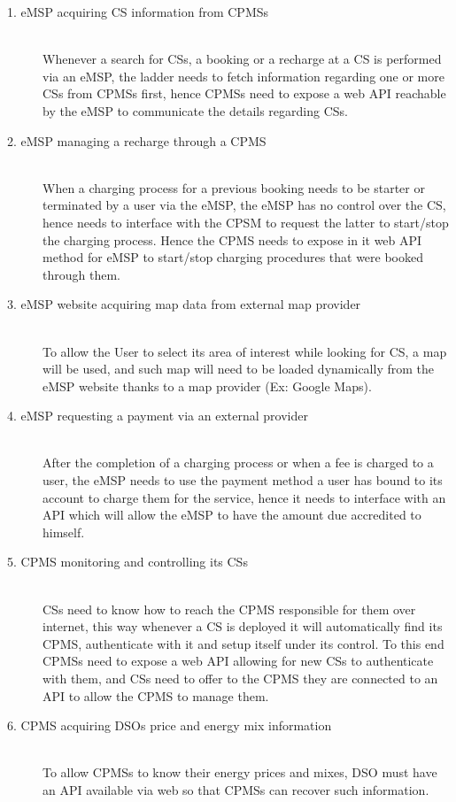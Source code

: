 \documentclass[11pt]{article}
\begin{document}
\begin{description}
    \item [1. eMSP acquiring CS information from CPMSs] \hfill \\
        Whenever a search for CSs, a booking or a recharge at a CS is performed via an eMSP, the ladder needs to fetch information regarding one or more CSs from CPMSs first, hence CPMSs need to expose a web API reachable by the eMSP to communicate the details regarding CSs.
    \item [2. eMSP  managing a recharge through a CPMS] \hfill \\
        When a charging process for a previous booking needs to be starter or terminated by a user via the eMSP, the eMSP has no control over the CS, hence needs to interface with the CPSM to request the latter to start/stop the charging process. Hence the CPMS needs to expose in it web API method for eMSP to start/stop charging procedures that were booked through them.
    \item [3. eMSP website acquiring map data from external map provider] \hfill \\
        To allow the User to select its area of interest while looking for CS, a map will be used, and such map will need to be loaded dynamically from the eMSP website thanks to a map provider (Ex: Google Maps).
    \item [4. eMSP requesting a payment via an external provider] \hfill \\
        After the completion of a charging process or when a fee is charged to a user, the eMSP needs to use the payment method a user has bound to its account to charge them for the service, hence it needs to interface with an API which will allow the eMSP to have the amount due accredited to himself.
    \item [5. CPMS monitoring and controlling its CSs] \hfill \\
        CSs need to know how to reach the CPMS responsible for them over internet, this way whenever a CS is deployed it will automatically find its CPMS, authenticate with it and setup itself under its control. To this end CPMSs need to expose a web API allowing for new CSs to authenticate with them, and CSs need to offer to the CPMS they are connected to an API to allow the CPMS to manage them.
    \item [6. CPMS acquiring DSOs price and energy mix information] \hfill \\
        To allow CPMSs to know their energy prices and mixes, DSO must have an API available via web so that CPMSs can recover such information.
\end{description}
\end{document}
